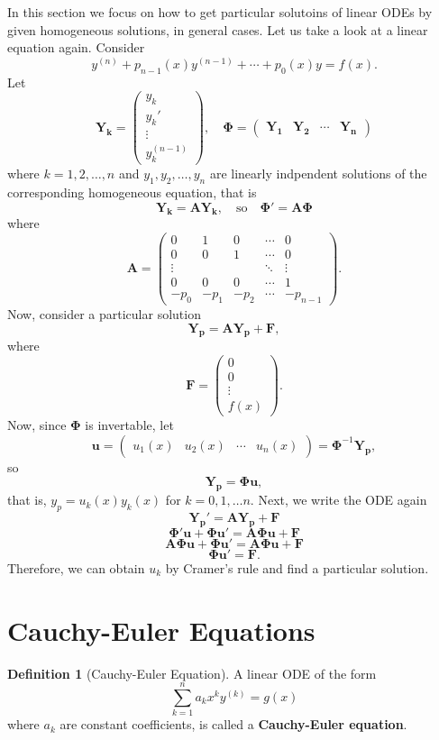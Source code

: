 \documentclass[12pt,a4paper]{report}
\theoremstyle{definition}
\newtheorem{definition}[theorem]{Definition}
\theoremstyle{remark}
\begin{document}
In this section we focus on how to get particular solutoins of linear ODEs by given homogeneous solutions, in general cases. Let us take a look at a linear equation again. Consider
\[y^{(n)} + p_{n - 1}(x)y^{(n - 1)} + \cdots + p_0(x)y = f(x).\]
Let
\[\mathbf{Y_k} = \begin{pmatrix}
    y_k\\ y_k' \\ \vdots \\ y_k^{(n - 1)}
\end{pmatrix}, \quad \mathbf{\Phi} =  \begin{pmatrix}
    \mathbf{Y_1} & \mathbf{Y_2} & \cdots & \mathbf{Y_n} 
\end{pmatrix}\]
where $k = 1, 2, \ldots, n$ and $y_1, y_2, \ldots, y_n$ are linearly indpendent solutions of the corresponding homogeneous equation, that is
\[
\mathbf{Y_k} = \mathbf{A}\mathbf{Y_k}, \quad \text{so} \quad 
\mathbf{\Phi}' = \mathbf{A}\mathbf{\Phi}
\]
where
\[\mathbf{A}=\begin{pmatrix}0&1&0&\cdots&0\\0&0&1&\cdots&0\\\vdots&&&\ddots&\vdots\\0&0&0&\cdots&1\\-p_0&-p_1&-p_2&\cdots&-p_{n-1}\end{pmatrix}.\]
Now, consider a particular solution
\[\mathbf{Y_p} = \mathbf{A}\mathbf{Y_p} + \mathbf{F},\]
where
\[\mathbf{F} = \begin{pmatrix}
    0 \\ 0 \\ \vdots \\ f(x) 
\end{pmatrix}.\]
Now, since $\mathbf{\Phi}$ is invertable, let
\[\mathbf{u} = \begin{pmatrix}
    u_1(x) & u_2(x) & \cdots & u_n(x)
\end{pmatrix}= \mathbf{\Phi}^{-1}\mathbf{Y_p},\]
so
\[
\mathbf{Y_p} = \mathbf{\Phi}\mathbf{u},
\]
that is, $y_p = u_k(x)y_k(x)$ for $k = 0, 1, \ldots n$. Next, we write the ODE again
\[\mathbf{Y_p}' = \mathbf{A}\mathbf{Y_p} + \mathbf{F}\]
\[\mathbf{\Phi}'\mathbf{u} + \mathbf{\Phi}\mathbf{u}' = \mathbf{A} \mathbf{\Phi}\mathbf{u} + \mathbf{F}\]
\[\mathbf{A}\mathbf{\Phi}\mathbf{u} + \mathbf{\Phi}\mathbf{u}' = \mathbf{A} \mathbf{\Phi}\mathbf{u} + \mathbf{F}\]
\[\mathbf{\Phi}\mathbf{u}' =  \mathbf{F}.\]
Therefore, we can obtain $u_k$ by Cramer's rule and find a particular solution.

\section{Cauchy-Euler Equations}
\begin{definition}[Cauchy-Euler Equation]
    A linear ODE of the form 
    \[\sum_{k = 1}^{n} a_k x^k y^{(k)} = g(x)\]
    where $a_k$ are constant coefficients, is called a \textbf{Cauchy-Euler equation}.
\end{definition}
\end{document}
